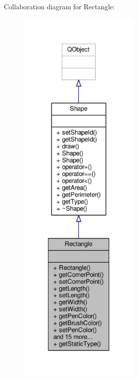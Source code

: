 Collaboration diagram for Rectangle\+:\nopagebreak
\begin{figure}[H]
\begin{center}
\leavevmode
\includegraphics[height=550pt]{classRectangle__coll__graph}
\end{center}
\end{figure}
